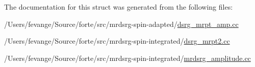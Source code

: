 The documentation for this struct was generated from the following files\+:\begin{DoxyCompactItemize}
\item 
/\+Users/fevange/\+Source/forte/src/mrdsrg-\/spin-\/adapted/\mbox{\hyperlink{dsrg__mrpt__amp_8cc}{dsrg\+\_\+mrpt\+\_\+amp.\+cc}}\item 
/\+Users/fevange/\+Source/forte/src/mrdsrg-\/spin-\/integrated/\mbox{\hyperlink{dsrg__mrpt2_8cc}{dsrg\+\_\+mrpt2.\+cc}}\item 
/\+Users/fevange/\+Source/forte/src/mrdsrg-\/spin-\/integrated/\mbox{\hyperlink{mrdsrg__amplitude_8cc}{mrdsrg\+\_\+amplitude.\+cc}}\end{DoxyCompactItemize}
